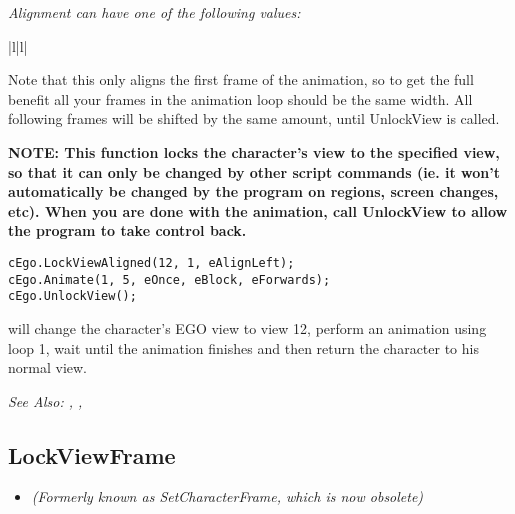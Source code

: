 \it{Alignment} can have one of the following values:

\begin{tabular}{|l|l|}
\end{tabular}

Note that this only aligns the first frame of the animation, so to get the full benefit
all your frames in the animation loop should be the same width. All following frames will
be shifted by the same amount, until UnlockView is called.

\bf{NOTE:} This function locks the character's view to the specified view, so
that it can only be changed by other script commands (ie. it won't
automatically be changed by the program on regions, screen changes,
etc). When you are done with the animation, call UnlockView to
allow the program to take control back.

\begin{verbatim}
cEgo.LockViewAligned(12, 1, eAlignLeft);
cEgo.Animate(1, 5, eOnce, eBlock, eForwards);
cEgo.UnlockView();
\end{verbatim}
will change the character's EGO view to view 12, perform an animation using loop 1,
wait until the animation finishes and then return the character to his normal view.

\it{See Also:} ,
,


\subsection{LockViewFrame}\label{Character.LockViewFrame}%

\begin{itemize}
\item \it{(Formerly known as SetCharacterFrame, which is now obsolete)}
\end{itemize}

